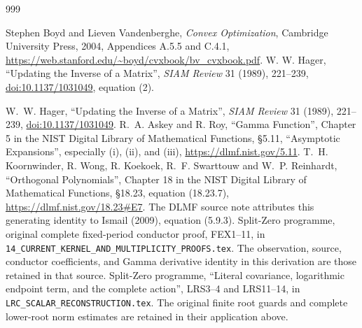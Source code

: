 \documentclass[11pt,a4paper]{article}
\begin{document}
\clearpage
\begin{thebibliography}{999}

 Stephen Boyd and Lieven Vandenberghe,
\emph{Convex Optimization}, Cambridge University Press, 2004,
Appendices A.5.5 and C.4.1,
\url{https://web.stanford.edu/~boyd/cvxbook/bv_cvxbook.pdf}.
 W. W. Hager, ``Updating the Inverse of a Matrix'',
\emph{SIAM Review} 31 (1989), 221--239,
\href{https://doi.org/10.1137/1031049}{doi:10.1137/1031049}, equation (2).

 W.~W. Hager, ``Updating the Inverse of a Matrix'',
\emph{SIAM Review} 31 (1989), 221--239,
\href{https://doi.org/10.1137/1031049}{doi:10.1137/1031049}.
 R.~A. Askey and R. Roy, ``Gamma Function'',
Chapter 5 in the NIST Digital Library of Mathematical Functions,
\S5.11, ``Asymptotic Expansions'', especially (i), (ii), and (iii),
\url{https://dlmf.nist.gov/5.11}.
 T.~H. Koornwinder, R. Wong, R. Koekoek,
R.~F. Swarttouw and W.~P. Reinhardt, ``Orthogonal Polynomials'',
Chapter 18 in the NIST Digital Library of Mathematical Functions,
\S18.23, equation (18.23.7),
\url{https://dlmf.nist.gov/18.23#E7}. The DLMF source note attributes
this generating identity to Ismail (2009), equation (5.9.3).
 Split-Zero programme, original complete
fixed-period conductor proof, FEX1--11, in
\texttt{14\_CURRENT\_KERNEL\_AND\_MULTIPLICITY\_PROOFS.tex}.
The observation, source, conductor coefficients, and Gamma derivative
identity in this derivation are those retained in that source.
 Split-Zero programme, ``Literal covariance,
logarithmic endpoint term, and the complete action'', LRS3--4 and
LRS11--14, in \texttt{LRC\_SCALAR\_RECONSTRUCTION.tex}.
The original finite root guards and complete lower-root norm estimates
are retained in their application above.


\end{thebibliography}
\end{document}
